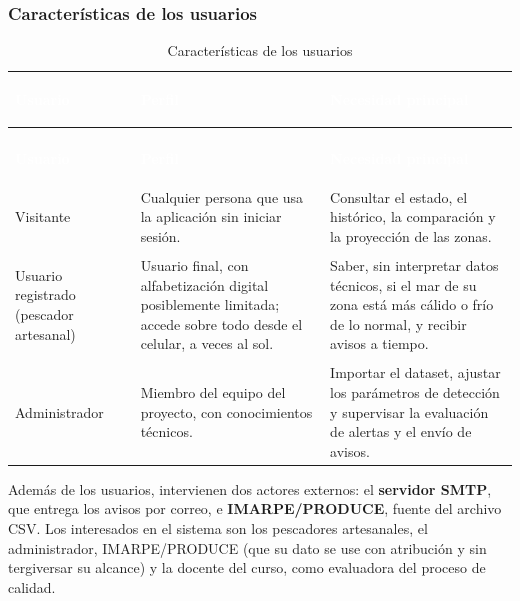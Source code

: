 \documentclass[11pt,a4paper,oneside]{article}
\begin{document}
\subsubsection{Características de los usuarios}

{\small
\begin{xltabular}{\textwidth}{@{}>{\sffamily\bfseries\raggedright\arraybackslash}p{3.2cm}YY@{}}
\caption{Características de los usuarios}\label{tab:usuarios}\\
\textcolor{white}{\sffamily\bfseries\footnotesize Usuario} & \textcolor{white}{\sffamily\bfseries\footnotesize Perfil} & \textcolor{white}{\sffamily\bfseries\footnotesize Necesidad principal}\\
\endfirsthead
{}\\
\textcolor{white}{\sffamily\bfseries\footnotesize Usuario} & \textcolor{white}{\sffamily\bfseries\footnotesize Perfil} & \textcolor{white}{\sffamily\bfseries\footnotesize Necesidad principal}\\
\endhead
Visitante & Cualquier persona que usa la aplicación sin iniciar sesión. & Consultar el estado, el histórico, la comparación y la proyección de las zonas.\\ \hline
{}Usuario registrado (pescador artesanal) & Usuario final, con alfabetización digital posiblemente limitada; accede sobre todo desde el celular, a veces al sol. & Saber, sin interpretar datos técnicos, si el mar de su zona está más cálido o frío de lo normal, y recibir avisos a tiempo.\\ \hline
Administrador & Miembro del equipo del proyecto, con conocimientos técnicos. & Importar el dataset, ajustar los parámetros de detección y supervisar la evaluación de alertas y el envío de avisos.\\ \hline
\end{xltabular}}
\vspace{0.6em}

Además de los usuarios, intervienen dos actores externos: el \textbf{servidor SMTP}, que entrega los avisos por correo, e \textbf{IMARPE/PRODUCE}, fuente del archivo CSV. Los interesados en el sistema son los pescadores artesanales, el administrador, IMARPE/PRODUCE (que su dato se use con atribución y sin tergiversar su alcance) y la docente del curso, como evaluadora del proceso de calidad.
\end{document}
